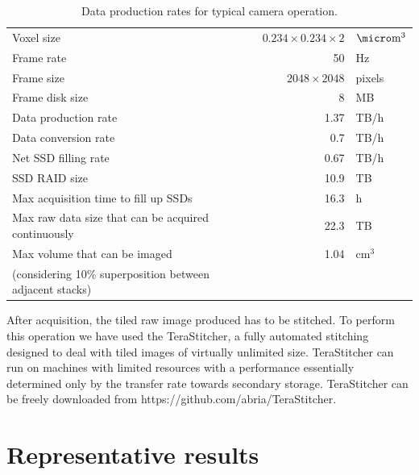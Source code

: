 \documentclass[12pt]{spieman}  %
\begin{document}
\begin{table}%
	\centering
		\caption[Data production]{Data production rates for typical camera operation.\label{tab:dataproduction}}
		\begin{tabular}{lrl}
		\\
		Voxel size																								& $0.234 \times 0.234 \times 2$	& $\micro\text{m}^3$ 	\\
		Frame rate																								& 50														& Hz								\\
		Frame size																								& $2048 \times 2048$ 						& pixels						\\
		Frame disk size																						& 8									 						& MB								\\
		Data production rate																			& 1.37							 						& TB/h 							\\
		Data conversion rate																			& 0.7								 						& TB/h 							\\
		Net SSD filling rate																			& 0.67							 						& TB/h 							\\
		SSD RAID size																							& 10.9							 						& TB								\\
		Max acquisition time to fill up SSDs											& 16.3							 						& h									\\
		Max raw data size that can be acquired continuously				& 22.3							 						& TB								\\
		Max volume that can be imaged 														& 1.04							 						& $\text{cm}^3$ 		\\
		(considering 10\% superposition between adjacent stacks)	&										 						&										\\
		\end{tabular}
\end{table}


		



After acquisition, the tiled raw image produced has to be stitched. To perform this operation we have used the TeraStitcher\cite{Bria2012}, a fully automated stitching designed to deal with tiled images of virtually unlimited size. TeraStitcher can run on machines with limited resources with a performance essentially determined only by the transfer rate towards secondary storage. TeraStitcher can be freely downloaded from https://github.com/abria/TeraStitcher.

\section{Representative results}
\end{document}

